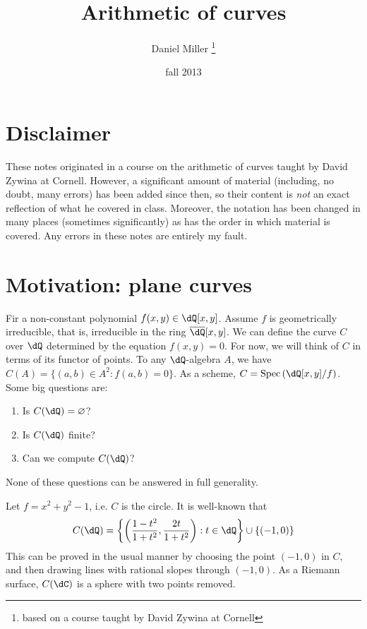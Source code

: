 \documentclass{article}
\title{Arithmetic of curves}
\author{Daniel Miller
  \thanks{based on a course taught by David Zywina at Cornell}}
\date{fall 2013}
\begin{document}
\maketitle
\tableofcontents










\section*{Disclaimer}

These notes originated in a course on the arithmetic of curves taught by David 
Zywina at Cornell. However, a significant amount of material (including, no 
doubt, many errors) has been added since then, so their content is \emph{not} 
an exact reflection of what he covered in class. Moreover, the notation has 
been changed in many places (sometimes significantly) as has the order in which 
material is covered. Any errors in these notes are entirely my fault. 










\section{Motivation: plane curves}

Fir a non-constant polynomial $f(x,y)\in\dQ[x,y]$. Assume $f$ is 
geometrically irreducible, that is, irreducible in the ring 
$\overline{\dQ}[x,y]$. We can define the curve $C$ over $\dQ$ determined by the 
equation $f(x,y)=0$. For now, we will think of $C$ in terms of its functor of 
points. To any $\dQ$-algebra $A$, we have $C(A)=\{(a,b)\in A^2:f(a,b)=0\}$. 
As a scheme, $C=\spec\left(\dQ[x,y]/f\right)$. Some big questions are:
\begin{enumerate}
  \item Is $C(\dQ)=\varnothing$?
  \item Is $C(\dQ)$ finite?
  \item Can we compute $C(\dQ)$?
\end{enumerate}
None of these questions can be answered in full generality. 

\begin{example}
Let $f=x^2+y^2-1$, i.e. $C$ is the circle. It is well-known that 
\[
  C(\dQ)=\left\{\left(\frac{1-t^2}{1+t^2},\frac{2t}{1+t^2}\right):t\in\dQ\right\}\cup \{(-1,0)\}
\]
This can be proved in the usual manner by choosing the point $(-1,0)$ in $C$, 
and then drawing lines with rational slopes through $(-1,0)$. As a Riemann 
surface, $C(\dC)$ is a sphere with two points removed. 
\end{example}
\end{document}
